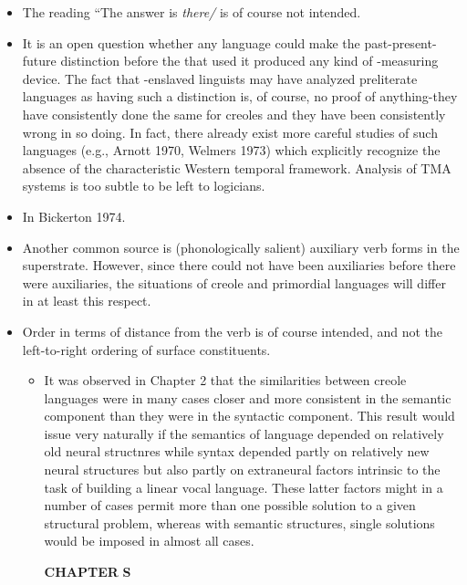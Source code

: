 \begin{itemize}
\begin{itemize}
\begin{itemize}
\begin{itemize}
\begin{itemize}
\begin{itemize}
\begin{itemize}
\begin{itemize}
\begin{itemize}
\begin{itemize}
\begin{itemize}
\begin{itemize}

\begin{itemize}
\item The reading ``The answer is \textit{ther}\textit{e}\textit{/{\textquotedbl}} is of course not intended.
\item It is an open question whether any language could make the past-present-future distinction before the  that used it produced any kind of -measuring device. The fact that -enslaved linguists may have analyzed preliterate languages as having such a distinction is, of course, no proof of anything-they have consistently done the same for creoles and they have been consistently wrong in so doing. In fact, there already exist more careful studies of such languages (e.g., Arnott 1970, Welmers 1973) which explicitly recognize the absence of the characteristic Western temporal framework. Analysis of TMA systems is too subtle to be left to logicians.
\end{itemize}
\begin{itemize}
\item In Bickerton 1974.
\item Another common source is (phonologically salient) auxiliary verb forms in the superstrate. However, since there could not have been auxiliaries before there were auxiliaries, the situations of creole and primordial languages will differ in at least this respect.
\item Order in terms of distance from the verb is of course intended, and not the left-to-right ordering of surface constituents.

\begin{itemize}
\item It was observed in Chapter 2 that the similarities between creole languages were in many cases closer and more consistent in the semantic component than they were in the syntactic component. This result would issue very naturally if the semantics of language depended on relatively old neural structnres while syntax depended partly on relatively new neural structures but also partly on extraneural factors intrinsic to the task of building a linear vocal language. These latter factors might in a number of cases permit more than one possible solution to a given structural problem, whereas with semantic struc\-tures, single solutions would be imposed in almost all cases.

\textbf{CHAPTER} \textbf{S}


\end{itemize}
\end{itemize}
\end{itemize}
\end{itemize}
\end{itemize}
\end{itemize}
\end{itemize}
\end{itemize}
\end{itemize}
\end{itemize}
\end{itemize}
\end{itemize}
\end{itemize}
\end{itemize}
